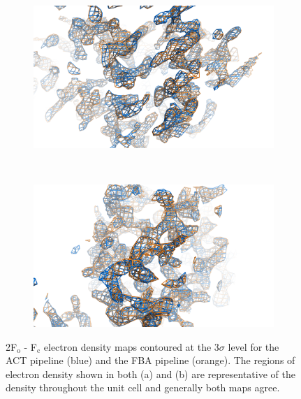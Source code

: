 \begin{figure}
    \centering
    \begin{subfigure}[b]{1.0\textwidth}
            \centering
            \includegraphics[width=\textwidth]{figures/datared/CPROT_elec_dens_comp1.png}
            \caption{}
            \label{fig:Electron density map 1 - C.Esp1396I}
    \end{subfigure}
    \\
    \begin{subfigure}[b]{1.0\textwidth}
            \centering
            \includegraphics[width=\textwidth]{figures/datared/CPROT_elec_dens_comp2.png}
            \caption{}
            \label{fig:Electron density map 2 - C.Esp1396I}
    \end{subfigure}
    \caption{2F$_{\text{o}}$ - F$_{\text{c}}$ electron density maps contoured at the 3$\sigma$ level for the ACT pipeline (blue) and the FBA pipeline (orange).
    The regions of electron density shown in both (a) and (b) are representative of the density throughout the unit cell and generally both maps agree.}
    \label{fig:Electron density maps - C.Esp1396I}
\end{figure}

